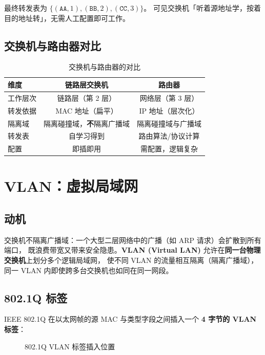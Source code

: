 最终转发表为 $\{(\texttt{AA},1),(\texttt{BB},2),(\texttt{CC},3)\}$。
可见交换机「听着源地址学，按着目的地址转」，无需人工配置即可工作。

\subsection{交换机与路由器对比}

\begin{table}[H]
\centering
\caption{交换机与路由器的对比}
\begin{tabulary}{\textwidth}{@{}LCC@{}}
\toprule
\textbf{维度} & \textbf{链路层交换机} & \textbf{路由器} \\
\midrule
工作层次 & 链路层（第 2 层） & 网络层（第 3 层） \\
转发依据 & MAC 地址（扁平） & IP 地址（层次化） \\
隔离域 & 隔离碰撞域，\textbf{不}隔离广播域 & 隔离碰撞域与广播域 \\
转发表 & 自学习得到 & 路由算法/协议计算 \\
配置 & 即插即用 & 需配置，逻辑复杂 \\
\bottomrule
\end{tabulary}
\end{table}

\section{VLAN：虚拟局域网}

\subsection{动机}

交换机不隔离广播域：一个大型二层网络中的广播（如 ARP 请求）会扩散到所有端口，
既浪费带宽又带来安全隐患。\textbf{VLAN (Virtual LAN)} 允许在\textbf{同一台物理交换机}上划分多个逻辑局域网，
使不同 VLAN 的流量相互隔离（隔离广播域），同一 VLAN 内即使跨多台交换机也如同在同一网段。

\subsection{802.1Q 标签}

IEEE 802.1Q 在以太网帧的源 MAC 与类型字段之间插入一个 \textbf{4 字节的 VLAN 标签}：

\begin{figure}[H]
\centering
{}
\caption{802.1Q VLAN 标签插入位置}
\label{fig:vlan_tag}
\end{figure}

